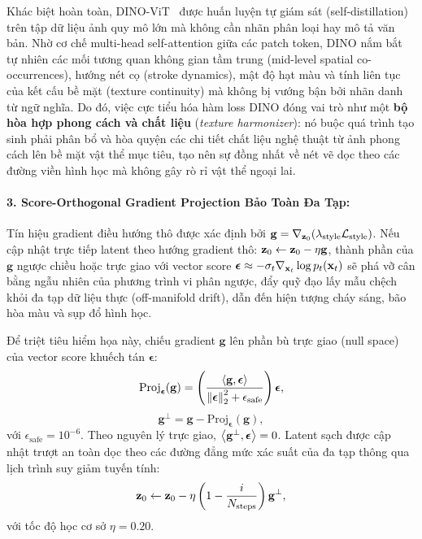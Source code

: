 \documentclass[runningheads]{llncs}
\begin{document}
Khác biệt hoàn toàn, DINO-ViT~\cite{dino} được huấn luyện tự giám sát (self-distillation) trên tập dữ liệu ảnh quy mô lớn mà không cần nhãn phân loại hay mô tả văn bản. Nhờ cơ chế multi-head self-attention giữa các patch token, DINO nắm bắt tự nhiên các mối tương quan không gian tầm trung (mid-level spatial co-occurrences), hướng nét cọ (stroke dynamics), mật độ hạt màu và tính liên tục của kết cấu bề mặt (texture continuity) mà không bị vướng bận bởi nhãn danh từ ngữ nghĩa. Do đó, việc cực tiểu hóa hàm loss DINO đóng vai trò như một \textbf{bộ hòa hợp phong cách và chất liệu} (\textit{texture harmonizer}): nó buộc quá trình tạo sinh phải phân bổ và hòa quyện các chi tiết chất liệu nghệ thuật từ ảnh phong cách lên bề mặt vật thể mục tiêu, tạo nên sự đồng nhất về nét vẽ dọc theo các đường viền hình học mà không gây rò rỉ vật thể ngoại lai.

\paragraph{3. Score-Orthogonal Gradient Projection Bảo Toàn Đa Tạp:}
Tín hiệu gradient điều hướng thô được xác định bởi $\mathbf{g} = \nabla_{\mathbf{z}_0} (\lambda_{\text{style}} \mathcal{L}_{\text{style}})$. Nếu cập nhật trực tiếp latent theo hướng gradient thô: $\mathbf{z}_0 \leftarrow \mathbf{z}_0 - \eta \mathbf{g}$, thành phần của $\mathbf{g}$ ngược chiều hoặc trực giao với vector score $\boldsymbol{\epsilon} \approx -\sigma_t \nabla_{\mathbf{x}_t} \log p_t(\mathbf{x}_t)$ sẽ phá vỡ cân bằng ngẫu nhiên của phương trình vi phân ngược, đẩy quỹ đạo lấy mẫu chệch khỏi đa tạp dữ liệu thực (off-manifold drift), dẫn đến hiện tượng cháy sáng, bão hòa màu và sụp đổ hình học.

Để triệt tiêu hiểm họa này, \method chiếu gradient $\mathbf{g}$ lên phần bù trực giao (null space) của vector score khuếch tán $\boldsymbol{\epsilon}$:
\begin{equation}
    \text{Proj}_{\boldsymbol{\epsilon}}(\mathbf{g}) = \left( \frac{\left\langle \mathbf{g}, \boldsymbol{\epsilon} \right\rangle}{\left\lVert\boldsymbol{\epsilon}\right\rVert_2^2 + \epsilon_{\text{safe}}} \right) \boldsymbol{\epsilon},
\end{equation}
\begin{equation}
    \mathbf{g}^\perp = \mathbf{g} - \text{Proj}_{\boldsymbol{\epsilon}}(\mathbf{g}),
    \label{eq:score_ortho_vn}
\end{equation}
với $\epsilon_{\text{safe}} = 10^{-6}$. Theo nguyên lý trực giao, $\left\langle \mathbf{g}^\perp, \boldsymbol{\epsilon} \right\rangle = 0$. Latent sạch được cập nhật trượt an toàn dọc theo các đường đẳng mức xác suất của đa tạp thông qua lịch trình suy giảm tuyến tính:
\begin{equation}
    \mathbf{z}_0 \leftarrow \mathbf{z}_0 - \eta \left( 1 - \frac{i}{N_{\text{steps}}} \right) \mathbf{g}^\perp,
\end{equation}
với tốc độ học cơ sở $\eta = 0.20$.
\end{document}
